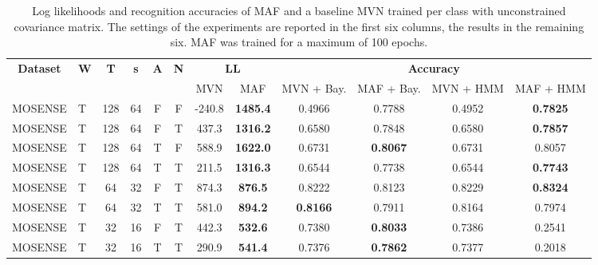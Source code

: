 \documentclass[11pt,titlepage,oneside,openany]{book}
\begin{document}
\begin{table}[H]
	\centering
	\tiny
	\begin{tabular}{c l c c c c c c c c c c}
		\toprule
		\multirow{2}{*}{\bfseries Dataset} & 
		\multirow{2}{*}{\bfseries W} & 
		\multirow{2}{*}{\bfseries T} &
		\multirow{2}{*}{\bfseries s} &
		\multirow{2}{*}{\bfseries A} &
		\multirow{2}{*}{\bfseries N} &
		\multicolumn{2}{c}{\bfseries LL} & 
		\multicolumn{4}{c}{\bfseries Accuracy}\\
		\cmidrule(lr){7-8}
		\cmidrule(lr){9-12}
		& & & & & & MVN & MAF & MVN + Bay. & MAF + Bay. & MVN + HMM & MAF + HMM \\
		\cmidrule(lr){1-12}
		MOSENSE &    T &     128 &      64 &    F &  F & -240.8 & \textbf{1485.4} &   0.4966 &   0.7788 &   0.4952 &   \textbf{0.7825} \\
		MOSENSE &    T &     128 &      64 &    F &  T &  437.3 & \textbf{1316.2} &   0.6580 &   0.7848 &   0.6580 &   \textbf{0.7857} \\
		MOSENSE &    T &     128 &      64 &    T &  F &  588.9 & \textbf{1622.0} &   0.6731 &   \textbf{0.8067} &   0.6731 &   0.8057 \\
		MOSENSE &    T &     128 &      64 &    T &  T &  211.5 & \textbf{1316.3} &   0.6544 &   0.7738 &   0.6544 &   \textbf{0.7743} \\
		MOSENSE &    T &      64 &      32 &    F &  T &  874.3 &  \textbf{876.5} &   0.8222 &   0.8123 &   0.8229 &   \textbf{0.8324} \\
		MOSENSE &    T &      64 &      32 &    T &  T &  581.0 &  \textbf{894.2} &   \textbf{0.8166} &   0.7911 &   0.8164 &   0.7974 \\
		MOSENSE &    T &      32 &      16 &    F &  T &  442.3 &  \textbf{532.6} &   0.7380 &   \textbf{0.8033} &   0.7386 &   0.2541 \\
		MOSENSE &    T &      32 &      16 &    T &  T &  290.9 &  \textbf{541.4} &   0.7376 &   \textbf{0.7862} &   0.7377 &   0.2018 \\
		\bottomrule
	\end{tabular}
	\caption[Evaluation results MotionSense, long]{\label{tab:mos} Log likelihoods and recognition accuracies of MAF and a baseline MVN trained per class with unconstrained covariance matrix. The settings of the experiments are reported in the first six columns, the results in the remaining six. MAF was trained for a maximum of 100 epochs.}
\end{table}
\end{document}
